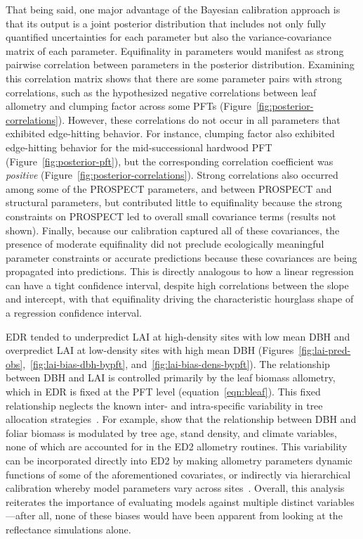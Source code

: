 That being said, one major advantage of the Bayesian calibration approach is that its output is a joint posterior distribution that includes not only fully quantified uncertainties for each parameter but also the variance-covariance matrix of each parameter.
Equifinality in parameters would manifest as strong pairwise correlation between parameters in the posterior distribution.
Examining this correlation matrix shows that there are some parameter pairs with strong correlations, such as the hypothesized negative correlations between leaf allometry and clumping factor across some PFTs (Figure~\ref{fig:posterior-correlations}).
However, these correlations do not occur in all parameters that exhibited edge-hitting behavior.
For instance, clumping factor also exhibited edge-hitting behavior for the mid-successional hardwood PFT (Figure~\ref{fig:posterior-pft}), but the corresponding correlation coefficient was \emph{positive} (Figure~\ref{fig:posterior-correlations}).
Strong correlations also occurred among some of the PROSPECT parameters, and between PROSPECT and structural parameters,
but contributed little to equifinality because the strong constraints on PROSPECT led to overall small covariance terms (results not shown).
Finally, because our calibration captured all of these covariances, the presence of moderate equifinality did not preclude ecologically meaningful parameter constraints or accurate predictions because these covariances are being propagated into predictions.
This is directly analogous to how a linear regression can have a tight confidence interval, despite high correlations between the slope and intercept, with that equifinality driving the characteristic hourglass shape of a regression confidence interval.

EDR tended to underpredict LAI at high-density sites with low mean DBH and overpredict LAI at low-density sites with high mean DBH (Figures~\ref{fig:lai-pred-obs},~\ref{fig:lai-bias-dbh-bypft}, and~\ref{fig:lai-bias-dens-bypft}).
The relationship between DBH and LAI is controlled primarily by the leaf biomass allometry, which in EDR is fixed at the PFT level (equation~\ref{eqn:bleaf}).
This fixed relationship neglects the known inter- and intra-specific variability in tree allocation strategies~\citep{forrester2017generalized, dolezal2020contrasting}.
For example, \citet{forrester2017generalized} show that the relationship between DBH and foliar biomass is modulated by tree age, stand density, and climate variables, none of which are accounted for in the ED2 allometry routines.
This variability can be incorporated directly into ED2 by making allometry parameters dynamic functions of some of the aforementioned covariates,
or indirectly via hierarchical calibration whereby model parameters vary across sites~\citep{dietze2008capturing}.
Overall, this analysis reiterates the importance of evaluating models against multiple distinct variables---after all, none of these biases would have been apparent from looking at the reflectance simulations alone.

